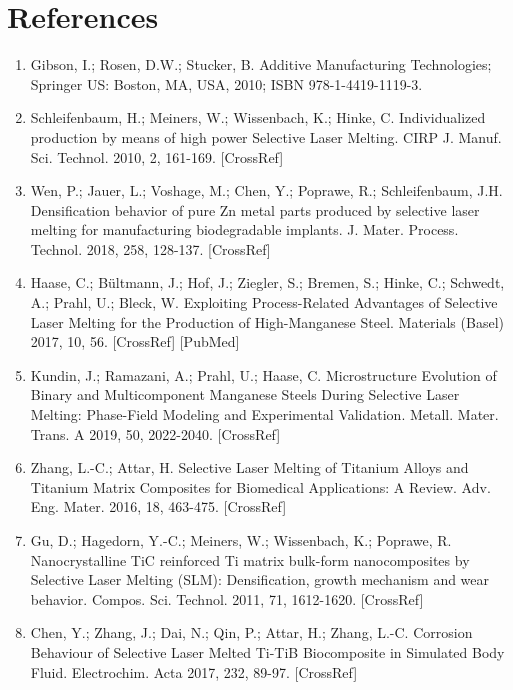 \documentclass[10pt]{article}
\begin{document}
\section*{References}
\begin{enumerate}
  \item Gibson, I.; Rosen, D.W.; Stucker, B. Additive Manufacturing Technologies; Springer US: Boston, MA, USA, 2010; ISBN 978-1-4419-1119-3.

  \item Schleifenbaum, H.; Meiners, W.; Wissenbach, K.; Hinke, C. Individualized production by means of high power Selective Laser Melting. CIRP J. Manuf. Sci. Technol. 2010, 2, 161-169. [CrossRef]

  \item Wen, P.; Jauer, L.; Voshage, M.; Chen, Y.; Poprawe, R.; Schleifenbaum, J.H. Densification behavior of pure Zn metal parts produced by selective laser melting for manufacturing biodegradable implants. J. Mater. Process. Technol. 2018, 258, 128-137. [CrossRef]

  \item Haase, C.; Bültmann, J.; Hof, J.; Ziegler, S.; Bremen, S.; Hinke, C.; Schwedt, A.; Prahl, U.; Bleck, W. Exploiting Process-Related Advantages of Selective Laser Melting for the Production of High-Manganese Steel. Materials (Basel) 2017, 10, 56. [CrossRef] [PubMed]

  \item Kundin, J.; Ramazani, A.; Prahl, U.; Haase, C. Microstructure Evolution of Binary and Multicomponent Manganese Steels During Selective Laser Melting: Phase-Field Modeling and Experimental Validation. Metall. Mater. Trans. A 2019, 50, 2022-2040. [CrossRef]

  \item Zhang, L.-C.; Attar, H. Selective Laser Melting of Titanium Alloys and Titanium Matrix Composites for Biomedical Applications: A Review. Adv. Eng. Mater. 2016, 18, 463-475. [CrossRef]

  \item Gu, D.; Hagedorn, Y.-C.; Meiners, W.; Wissenbach, K.; Poprawe, R. Nanocrystalline TiC reinforced Ti matrix bulk-form nanocomposites by Selective Laser Melting (SLM): Densification, growth mechanism and wear behavior. Compos. Sci. Technol. 2011, 71, 1612-1620. [CrossRef]

  \item Chen, Y.; Zhang, J.; Dai, N.; Qin, P.; Attar, H.; Zhang, L.-C. Corrosion Behaviour of Selective Laser Melted Ti-TiB Biocomposite in Simulated Body Fluid. Electrochim. Acta 2017, 232, 89-97. [CrossRef]


\end{enumerate}
\end{document}
